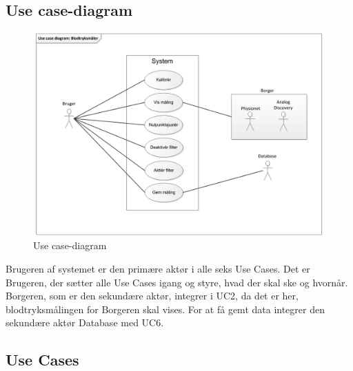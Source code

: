 \subsection{Use case-diagram}
\begin{figure}[H]
	\centering
	\includegraphics[width=1\textwidth]{Figurer/Snip20151001_20}
	\caption{Use case-diagram}
	\label{fig:Use case-diagram}
\end{figure}

Brugeren af systemet er den primære aktør i alle seks Use Cases. Det er Brugeren, der sætter alle Use Cases igang og styre, hvad der skal ske og hvornår. Borgeren, som er den sekundære aktør, integrer i UC2, da det er her, blodtryksmålingen for Borgeren skal vises. For at få gemt data integrer den sekundære aktør Database med UC6.  

\subsection{Use Cases}

